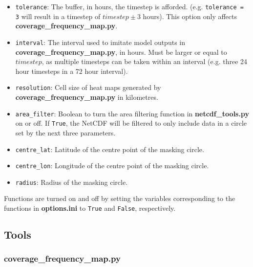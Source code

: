 \documentclass{article}
\begin{document}
\begin{itemize}
\begin{itemize}
                    \item \verb?tolerance?: The buffer, in hours, the timestep is afforded. (e.g. \verb?tolerance = 3? will result in a timestep of $timestep \pm 3$ hours). This option only affects \textbf{coverage\_frequency\_map.py}.
                    \item \verb?interval?: The interval used to imitate model outputs in \textbf{coverage\_frequency\_map.py}, in hours. Must be larger or equal to $timestep$, as multiple timesteps can be taken within an interval (e.g. three 24 hour timesteps in a 72 hour interval).
                    \item \verb?resolution?: Cell size of heat maps generated by \textbf{coverage\_frequency\_map.py} in kilometres.
                    \item \verb?area_filter?: Boolean to turn the area filtering function in \textbf{netcdf\_tools.py} on or off. If \verb?True?, the NetCDF will be filtered to only include data in a circle set by the next three parameters.
                    \item \verb?centre_lat?: Latitude of the centre point of the masking circle.
                    \item \verb?centre_lon?: Longitude of the centre point of the masking circle.
                    \item \verb?radius?: Radius of the masking circle.
                \end{itemize}
            \end{itemize}

        Functions are turned on and off by setting the variables corresponding to the functions in \textbf{options.ini} to \verb?True? and \verb?False?, respectively.

    \subsection{Tools}

        \subsubsection{\textbf{coverage\_frequency\_map.py}}
\end{document}

